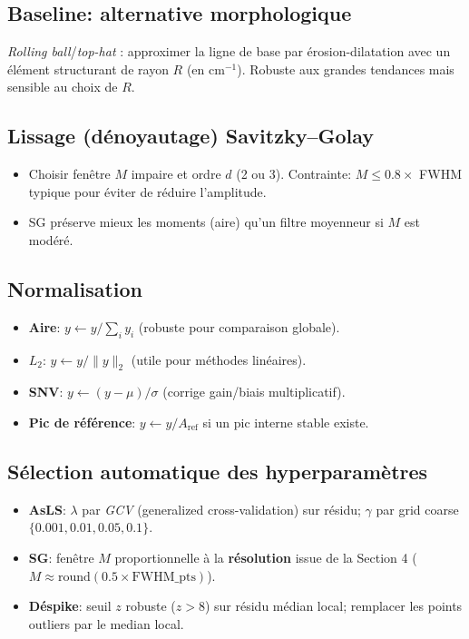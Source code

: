 \subsection{Baseline: alternative morphologique}
\emph{Rolling ball}/\emph{top-hat} : approximer la ligne de base par érosion-dilatation avec un élément structurant de rayon $R$ (en cm$^{-1}$). Robuste aux grandes tendances mais sensible au choix de $R$.

\subsection{Lissage (dénoyautage) Savitzky--Golay}
\begin{itemize}[nosep]
\item Choisir fenêtre $M$ impaire et ordre $d$ (2 ou 3). Contrainte: $M \le 0.8 \times$ FWHM typique pour éviter de réduire l'amplitude.
\item SG préserve mieux les moments (aire) qu'un filtre moyenneur si $M$ est modéré.
\end{itemize}

\subsection{Normalisation}
\begin{itemize}[nosep]
\item \textbf{Aire}: $y \leftarrow y/\sum_i y_i$ (robuste pour comparaison globale).
\item \textbf{$L_2$}: $y \leftarrow y/\|y\|_2$ (utile pour méthodes linéaires).
\item \textbf{SNV}: $y \leftarrow (y-\mu)/\sigma$ (corrige gain/biais multiplicatif).
\item \textbf{Pic de référence}: $y \leftarrow y/A_{\text{ref}}$ si un pic interne stable existe.
\end{itemize}

\subsection{Sélection automatique des hyperparamètres}
\begin{itemize}[nosep]
\item \textbf{AsLS}: $\lambda$ par \emph{GCV} (generalized cross-validation) sur résidu; $\gamma$ par grid coarse $\{0.001,0.01,0.05,0.1\}$.
\item \textbf{SG}: fenêtre $M$ proportionnelle à la \textbf{résolution} issue de la Section 4 ($M \approx \mathrm{round}(0.5\times \mathrm{FWHM\_pts})$).
\item \textbf{Déspike}: seuil $z$ robuste ($z>8$) sur résidu médian local; remplacer les points outliers par le median local.
\end{itemize}

